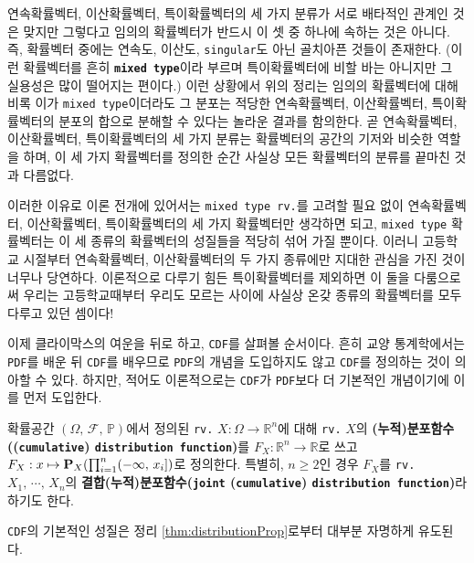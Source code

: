 연속확률벡터, 이산확률벡터, 특이확률벡터의 세 가지 분류가 서로 배타적인 관계인 것은 맞지만 그렇다고 임의의 확률벡터가 반드시 이 셋 중 하나에 속하는 것은 아니다. 즉, 확률벡터 중에는 연속도, 이산도, \texttt{singular}도 아닌 골치아픈 것들이 존재한다. (이런 확률벡터를 흔히 \textbf{\texttt{mixed type}}이라 부르며 특이확률벡터에 비할 바는 아니지만 그 실용성은 많이 떨어지는 편이다.) 이런 상황에서 위의 정리는 임의의 확률벡터에 대해 비록 이가 \texttt{mixed type}이더라도 그 분포는 적당한 연속확률벡터, 이산확률벡터, 특이확률벡터의 분포의 합으로 분해할 수 있다는 놀라운 결과를 함의한다. 곧 연속확률벡터, 이산확률벡터, 특이확률벡터의 세 가지 분류는 확률벡터의 공간의 기저와 비슷한 역할을 하며, 이 세 가지 확률벡터를 정의한 순간 사실상 모든 확률벡터의 분류를 끝마친 것과 다름없다.

이러한 이유로 이론 전개에 있어서는 \texttt{mixed type rv.}를 고려할 필요 없이 연속확률벡터, 이산확률벡터, 특이확률벡터의 세 가지 확률벡터만 생각하면 되고, \texttt{mixed type} 확률벡터는 이 세 종류의 확률벡터의 성질들을 적당히 섞어 가질 뿐이다. 이러니 고등학교 시절부터 연속확률벡터, 이산확률벡터의 두 가지 종류에만 지대한 관심을 가진 것이 너무나 당연하다. 이론적으로 다루기 힘든 특이확률벡터를 제외하면 이 둘을 다룸으로써 우리는 고등학교때부터 우리도 모르는 사이에 사실상 온갖 종류의 확률벡터를 모두 다루고 있던 셈이다!

이제 클라이막스의 여운을 뒤로 하고, \texttt{CDF}를 살펴볼 순서이다. 흔히 교양 통계학에서는 \texttt{PDF}를 배운 뒤 \texttt{CDF}를 배우므로 \texttt{PDF}의 개념을 도입하지도 않고 \texttt{CDF}를 정의하는 것이 의아할 수 있다. 하지만, 적어도 이론적으로는 \texttt{CDF}가 \texttt{PDF}보다 더 기본적인 개념이기에 이를 먼저 도입한다.

\begin{definition}
    확률공간 $(\Omega,\,\mathcal{F},\,\mathbb{P})$에서 정의된 \texttt{rv.} $X:\Omega\to\mathbb{R}^n$에 대해 \texttt{rv.} $X$의 \textbf{(누적)분포함수((\texttt{cumulative}) \texttt{distribution function})}를 $F_X:\mathbb{R}^n\to\mathbb{R}$로 쓰고 $F_X:x\mapsto\mathbf{P}_X(\prod_{i=1}^n(-\infty,\,x_i])$로 정의한다. 특별히, $n\geq2$인 경우 $F_X$를 \texttt{rv.} $X_1,\,\cdots,\,X_n$의 \textbf{결합(누적)분포함수(\texttt{joint} (\texttt{cumulative}) \texttt{distribution function})}라 하기도 한다.
\end{definition}

\texttt{CDF}의 기본적인 성질은 정리 \ref{thm:distributionProp}로부터 대부분 자명하게 유도된다.


